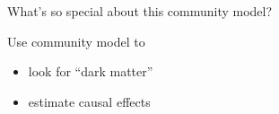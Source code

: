 \documentclass{beamer}
\begin{document}
\begin{frame}

\begin{center}
\end{center}

\end{frame}
\begin{frame}

\begin{center}
\Large{
What's so special about this community model?
}
\end{center}

\end{frame}
\begin{frame}

Use community model to
\begin{itemize}
\item look for ``dark matter''
\item estimate causal effects
\end{itemize}

\end{frame}
\end{document}

